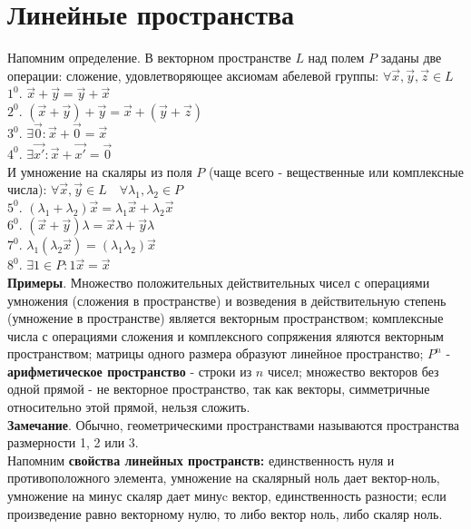 \section{Линейные пространства}
Напомним определение. В векторном пространстве $L$ над полем $P$ заданы две
операции: сложение, удовлетворяющее аксиомам абелевой группы: $\forall \Vec{x},
\Vec{y}, \Vec{z} \in L$\\
$1^0$. $\Vec{x}+\Vec{y}=\Vec{y}+\Vec{x}$\\
$2^0$. $(\Vec{x}+\Vec{y})+\Vec{y}=\Vec{x}+(\Vec{y}+\Vec{z})$\\
$3^0$. $\exists \Vec{0}: \Vec{x}+\Vec{0}=\Vec{x}$\\
$4^0$. $\exists \Vec{x'}: \Vec{x}+\Vec{x'}=\Vec{0}$\\
И умножение на скаляры из поля $P$ (чаще всего - вещественные или комплексные
числа): $\forall \Vec{x},\Vec{y}\in L \quad\forall \lambda_1,\lambda_2 \in P$\\
$5^0$. $(\lambda_1+\lambda_2)\Vec{x}=\lambda_1\Vec{x}+\lambda_2\Vec{x} $\\
$6^0$. $(\Vec{x}+\Vec{y})\lambda=\Vec{x}\lambda+\Vec{y}\lambda $\\
$7^0$. $\lambda_1(\lambda_2\Vec{x})=(\lambda_1\lambda_2)\Vec{x}$\\
$8^0$. $\exists 1\in P: 1\Vec{x}=\Vec{x}$\\
\textbf{Примеры}. Множество положительных действительных чисел с операциями 
умножения (сложения в пространстве) и возведения в действительную степень 
(умножение в пространстве) является векторным пространством; комплексные числа
с операциями сложения и комплексного сопряжения яляются векторным 
пространством; матрицы одного размера образуют линейное пространство; $P^n$ -
\textbf{арифметическое пространство} - строки из $n$ чисел; множество векторов
без одной прямой - не векторное пространство, так как векторы, симметричные 
относительно этой прямой, нельзя сложить.\\
\textbf{Замечание}. Обычно, геометрическими пространствами называются 
пространства размерности 1, 2 или 3.\\
Напомним \textbf{свойства линейных пространств:} единственность нуля и 
противоположного элемента, умножение на скалярный ноль дает вектор-ноль, 
умножение на минус скаляр дает минуc вектор, единственность разности; если 
произведение равно векторному нулю, то либо вектор ноль, либо скаляр ноль.
